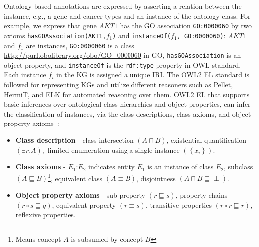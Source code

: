 \hspace*{3.5mm} Ontology-based annotations are expressed by asserting a relation between the instance, e.g., a gene and cancer types and an instance of the ontology class. For example, we express that gene $AKT1$ has the GO association \texttt{GO:0000060} by two axioms \texttt{hasGOAssociation(AKT1,$f_1$)} and \texttt{instanceOf($f_1$, GO:0000060)}: $AKT1$ and $f_1$ are instances, \texttt{GO:0000060} is a class \url{http://purl.obolibrary.org/obo/GO\_0000060} in GO, \texttt{hasGOAssociation} is an object property, and \texttt{instanceOf} is the \texttt{rdf:type} property in OWL standard. Each instance $f_i$ in the KG is assigned a unique IRI. The OWL2 EL standard is followed for representing KGs and utilize different reasoners such as Pellet, HermiT, and ELK for automated reasoning over them. OWL2 EL that supports basic inferences over ontological class hierarchies and object properties, can infer the classification of instances, via  the class descriptions, class axioms, and object property axioms~\cite{alshahrani2017neuro}: 

\begin{itemize}[noitemsep]
\vspace{-2mm}
    \item \textbf{Class description} - class intersection $(A \sqcap B)$, existential quantification $(\exists r . A),$ limited enumeration using a single instance $\left(\left\{x_{i}\right\}\right)$. 
    \item \textbf{Class axioms} - $E_{1}$:$E_{2}$ indicates entity $E_{1}$ is an instance of class $E_{2}$, subclass $(A \sqsubseteq B)$\footnote{Means concept $A$ is subsumed by concept $B$}, equivalent class $(A \equiv B)$, disjointness $(A \sqcap B \sqsubseteq \perp)$. 
    \item \textbf{Object property axioms} - sub-property $(r \sqsubseteq s)$, property chains $(r \circ s \sqsubseteq q)$, equivalent property $(r \equiv s)$, transitive properties $(r \circ r \sqsubseteq r)$, reflexive properties. 
    \vspace{-2mm}
\end{itemize}

